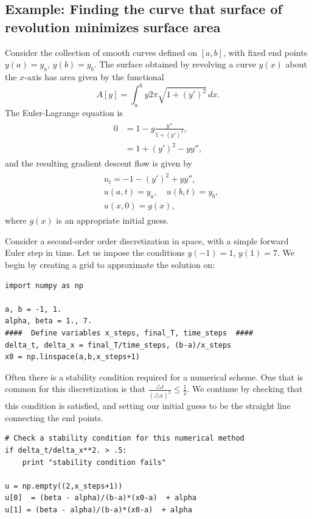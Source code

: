 \subsection*{Example: Finding the curve that surface of revolution minimizes surface area}
Consider the collection of smooth curves defined on $[a,b]$, with fixed end points $y(a) = y_a$, $y(b) = y_b$. The surface obtained by revolving a curve $y(x)$ about the $x$-axis has area given by the functional 
\[A[y] = \int_a^b y 2 \pi \sqrt{1 + (y')^2} \, dx.
\]
The Euler-Lagrange equation is 
\begin{align}
	\begin{split}
	0 &= 1 - y \frac{y''}{1 + (y')^2} , \\
	&= 1 + (y')^2 - y y'',
	\end{split}\label{tv_images:SA_EL_equation}
\end{align}
and the resulting gradient descent flow is given by
\begin{align}
	\begin{split}
	&{ } u_t = -1 - (y')^2 + y y'', \\
	&{ } u(a,t) = y_a, \quad u(b,t) = y_b,\\
	&{ } u(x,0) = g(x),
	\end{split}\label{tv_images:SA_flow}
\end{align}
where $g(x)$ is an appropriate initial guess.

Consider a second-order order discretization in space, with a simple forward Euler step in time. Let us impose the conditions $y(-1) = 1$, $y(1) = 7$. We begin by creating a grid to approximate the solution on: 
\begin{lstlisting}
import numpy as np

a, b = -1, 1.
alpha, beta = 1., 7.
####  Define variables x_steps, final_T, time_steps  ####
delta_t, delta_x = final_T/time_steps, (b-a)/x_steps
x0 = np.linspace(a,b,x_steps+1)
\end{lstlisting}

Often there is a stability condition required for a numerical scheme. 
One that is common for this discretization is that $\frac{\triangle t}{(\triangle x)^2} \leq \frac{1}{2}$.  
We continue by checking that this condition is satisfied, and setting our initial guess to be the straight line connecting the end points. 

\begin{lstlisting}
# Check a stability condition for this numerical method
if delta_t/delta_x**2. > .5:
	print "stability condition fails"
	
u = np.empty((2,x_steps+1))
u[0]  = (beta - alpha)/(b-a)*(x0-a)  + alpha
u[1] = (beta - alpha)/(b-a)*(x0-a)  + alpha
\end{lstlisting}

